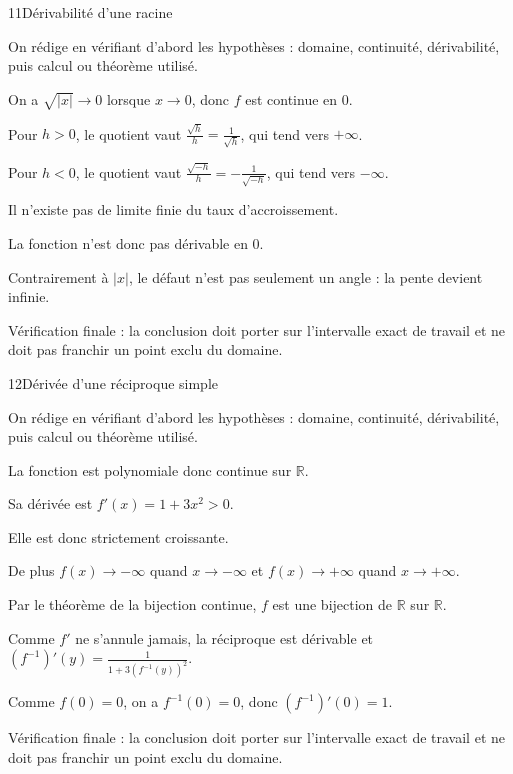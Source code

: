\documentclass[11pt,a4paper]{article}
\newcommand{\R}{\mathbb{R}}
\begin{document}
\begin{corrbox}{11}{Dérivabilité d'une racine}

\begin{methodebox}
On rédige en vérifiant d'abord les hypothèses : domaine, continuité, dérivabilité, puis calcul ou théorème utilisé.
\end{methodebox}

On a $\sqrt{|x|}\to0$ lorsque $x\to0$, donc $f$ est continue en $0$.


Pour $h>0$, le quotient vaut $\frac{\sqrt h}{h}=\frac1{\sqrt h}$, qui tend vers $+\infty$.


Pour $h<0$, le quotient vaut $\frac{\sqrt{-h}}{h}=-\frac1{\sqrt{-h}}$, qui tend vers $-\infty$.


Il n'existe pas de limite finie du taux d'accroissement.


La fonction n'est donc pas dérivable en $0$.


Contrairement à $|x|$, le défaut n'est pas seulement un angle : la pente devient infinie.


\begin{attentionbox}
Vérification finale : la conclusion doit porter sur l'intervalle exact de travail et ne doit pas franchir un point exclu du domaine.
\end{attentionbox}

\end{corrbox}


\begin{corrbox}{12}{Dérivée d'une réciproque simple}

\begin{methodebox}
On rédige en vérifiant d'abord les hypothèses : domaine, continuité, dérivabilité, puis calcul ou théorème utilisé.
\end{methodebox}

La fonction est polynomiale donc continue sur $\R$.


Sa dérivée est $f'(x)=1+3x^2>0$.


Elle est donc strictement croissante.


De plus $f(x)\to-\infty$ quand $x\to-\infty$ et $f(x)\to+\infty$ quand $x\to+\infty$.


Par le théorème de la bijection continue, $f$ est une bijection de $\R$ sur $\R$.


Comme $f'$ ne s'annule jamais, la réciproque est dérivable et $(f^{-1})'(y)=\frac1{1+3(f^{-1}(y))^2}$.


Comme $f(0)=0$, on a $f^{-1}(0)=0$, donc $(f^{-1})'(0)=1$.


\begin{attentionbox}
Vérification finale : la conclusion doit porter sur l'intervalle exact de travail et ne doit pas franchir un point exclu du domaine.
\end{attentionbox}

\end{corrbox}
\end{document}
